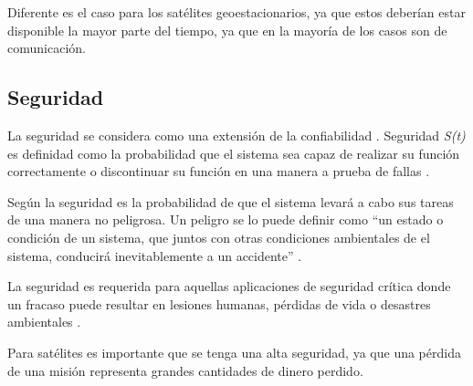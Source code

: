 Diferente es el caso para los satélites geoestacionarios, ya que estos deberían estar disponible la 
mayor parte del tiempo, ya que en la mayoría de los casos son de comunicación. 

\subsection{Seguridad}
La seguridad se considera como una extensión de la confiabilidad \citep{FTDesign}. Seguridad 
\textit{S(t)} es definidad como la probabilidad que el sistema sea capaz de realizar su función 
correctamente o discontinuar su función en una manera a prueba de fallas \citep{FTDesign}.

Según \cite{SoftwareFaultToleranceATutorial} la seguridad es la probabilidad de que el sistema 
levará a cabo sus tareas de una manera no peligrosa. Un peligro se lo puede definir como ``un 
estado o condición de un sistema, que juntos con otras condiciones ambientales de el sistema, 
conducirá inevitablemente a un accidente'' \citep{SoftwareFaultToleranceATutorial}.

La seguridad es requerida para aquellas aplicaciones de seguridad crítica donde un fracaso puede 
resultar en lesiones humanas, pérdidas de vida o desastres ambientales \citep{FTDesign}. 

Para satélites es importante que se tenga una alta seguridad, ya que una pérdida de una misión 
representa grandes cantidades de dinero perdido. 
